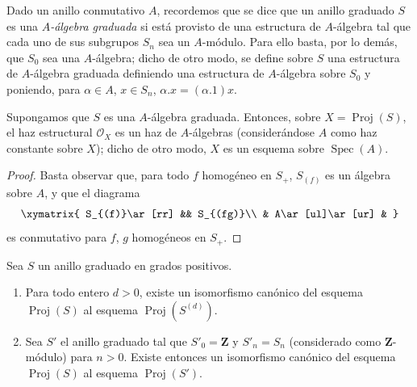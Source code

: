 \documentclass[oneside,10pt]{amsart}
\newcommand{\oldpage}[2][]{\marginnote{\normalfont\footnotesize\textbf{#1}~|~#2}\ignorespaces}
\let\EGAOriginalLabel\label
\renewcommand{\label}[1]{\phantomsection\EGAOriginalLabel{#1}}
\begin{document}
\begin{env}[2.4.5]
\label{II.2.4.5-fr}
Dado un anillo conmutativo $A$, recordemos que se dice que un anillo graduado $S$ es una \emph{$A$-álgebra graduada} si está provisto de una estructura de $A$-álgebra tal que cada uno de sus subgrupos $S_n$ sea un $A$-módulo.
Para ello basta, por lo demás, que $S_0$ sea
\oldpage[II]{30}
una $A$-álgebra; dicho de otro modo, se define sobre $S$ una estructura de $A$-álgebra graduada definiendo una estructura de $A$-álgebra sobre $S_0$ y poniendo, para $\alpha\in A$, $x\in S_n$, $\alpha.x=(\alpha.1)x$.
\end{env}

\begin{proposition}[2.4.6]
\label{II.2.4.6-fr}
Supongamos que $S$ es una $A$-álgebra graduada.
Entonces, sobre $X=\operatorname{Proj}(S)$, el haz estructural $\mathcal{O}_X$ es un haz de $A$-álgebras (considerándose $A$ como haz constante sobre $X$); dicho de otro modo, $X$ es un esquema sobre $\operatorname{Spec}(A)$.
\end{proposition}

\begin{proof}
Basta observar que, para todo $f$ homogéneo en $S_+$, $S_{(f)}$ es un álgebra sobre $A$, y que el diagrama
\[
  \xymatrix{
    S_{(f)}\ar[rr] && S_{(fg)}\\
    & A\ar[ul]\ar[ur] &
  }
\]
es conmutativo para $f$, $g$ homogéneos en $S_+$.
\end{proof}

\begin{proposition}[2.4.7]
\label{II.2.4.7-fr}
Sea $S$ un anillo graduado en grados positivos.
\begin{enumerate}
  \item[\rm(i)] Para todo entero $d>0$, existe un isomorfismo canónico del esquema $\operatorname{Proj}(S)$ al esquema $\operatorname{Proj}(S^{(d)})$.
  \item[\rm(ii)] Sea $S'$ el anillo graduado tal que $S'_0=\mathbf{Z}$ y $S'_n=S_n$ (considerado como $\mathbf{Z}$-módulo) para $n>0$. Existe entonces un isomorfismo canónico del esquema $\operatorname{Proj}(S)$ al esquema $\operatorname{Proj}(S')$.
\end{enumerate}
\end{proposition}
\end{document}
